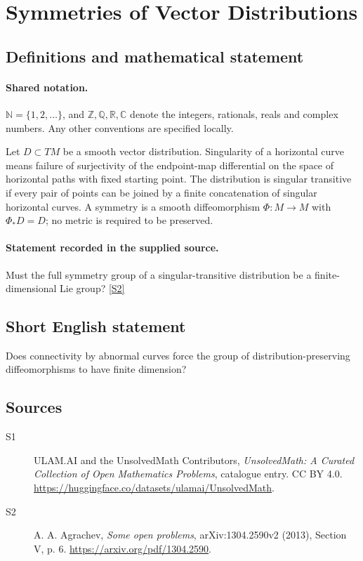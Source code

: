 \documentclass[11pt]{article}
\newcommand{\sref}[2]{\hyperlink{source:#1:#2}{[S#2]}}
\begin{document}
\section{Symmetries of Vector Distributions}\label{statement}

\subsection{Definitions and mathematical statement}

\paragraph{Shared notation.}$\mathbb N=\{1,2,\ldots\}$, and $\mathbb Z,\mathbb Q,\mathbb R,\mathbb C$ denote the integers, rationals, reals and complex numbers. Any other conventions are specified locally.


Let $D\subset TM$ be a smooth vector distribution. Singularity of a horizontal curve means failure of surjectivity of the endpoint-map differential on the space of horizontal paths with fixed starting point. The distribution is singular transitive if every pair of points can be joined by a finite concatenation of singular horizontal curves. A symmetry is a smooth diffeomorphism $\Phi:M\to M$ with $\Phi_*D=D$; no metric is required to be preserved.
\paragraph{Statement recorded in the supplied source.}
Must the full symmetry group of a singular-transitive distribution be a finite-dimensional Lie group? \sref{statement}{2}
\subsection{Short English statement}
Does connectivity by abnormal curves force the group of distribution-preserving diffeomorphisms to have finite dimension?
\subsection{Sources}
\begin{description}
\item[\hypertarget{source:statement:1}{S1}] ULAM.AI and the UnsolvedMath Contributors, \emph{UnsolvedMath: A Curated Collection of Open Mathematics Problems}, catalogue entry. CC BY 4.0. \url{https://huggingface.co/datasets/ulamai/UnsolvedMath}.
\item[\hypertarget{source:statement:2}{S2}] A. A. Agrachev, \emph{Some open problems}, arXiv:1304.2590v2 (2013), Section V, p. 6. \url{https://arxiv.org/pdf/1304.2590}.
\end{description}
\label{end:statement}
\end{document}
